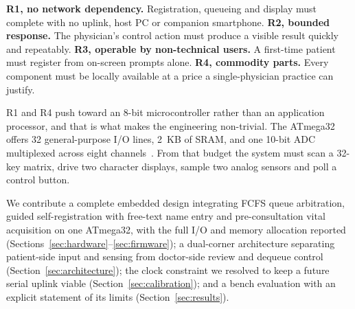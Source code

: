 \textbf{R1, no network dependency.} Registration, queueing and display must complete with no
uplink, host PC or companion smartphone. \textbf{R2, bounded response.} The physician's control
action must produce a visible result quickly and repeatably. \textbf{R3, operable by
non-technical users.} A first-time patient must register from on-screen prompts alone.
\textbf{R4, commodity parts.} Every component must be locally available at a price a
single-physician practice can justify.

R1 and R4 push toward an 8-bit microcontroller rather than an application processor, and that is what
makes the engineering non-trivial. The ATmega32 offers 32 general-purpose I/O lines, 2~KB of SRAM, and
one 10-bit ADC multiplexed across eight channels~\cite{microchip2020}. From that budget the system
must scan a 32-key matrix, drive two character displays, sample two analog sensors and poll a control
button.

We contribute a complete embedded design integrating FCFS queue arbitration, guided self-registration
with free-text name entry and pre-consultation vital acquisition on one ATmega32, with the full I/O
and memory allocation reported (Sections~\ref{sec:hardware}--\ref{sec:firmware}); a dual-corner
architecture separating patient-side input and sensing from doctor-side review and dequeue control
(Section~\ref{sec:architecture}); the clock constraint we resolved to keep a future serial uplink
viable (Section~\ref{sec:calibration}); and a bench evaluation with an explicit statement of its
limits (Section~\ref{sec:results}).

